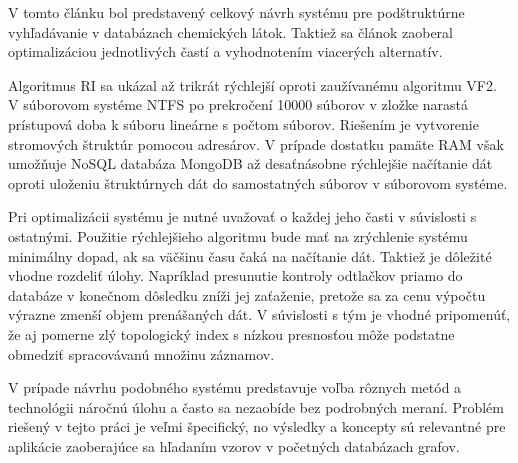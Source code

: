 \documentclass[slovak]{ExcelAtFIT} %
\begin{document}
V tomto článku bol predstavený celkový návrh systému pre podštruktúrne vyhľadávanie v databázach chemických látok. Taktiež sa článok zaoberal optimalizáciou jednotlivých častí a vyhodnotením viacerých alternatív.

Algoritmus RI sa ukázal až trikrát rýchlejší oproti zaužívanému algoritmu VF2. V súborovom systéme NTFS po prekročení 10000 súborov v zložke narastá prístupová doba k súboru lineárne s počtom súborov. Riešením je vytvorenie stromových štruktúr pomocou adresárov. V prípade dostatku pamäte RAM však umožňuje NoSQL databáza MongoDB až desaťnásobne rýchlejšie načítanie dát oproti uloženiu štruktúrnych dát do samostatných súborov v súborovom systéme. 

Pri optimalizácii systému je nutné uvažovať o každej jeho časti v súvislosti s ostatnými. Použitie rýchlejšieho algoritmu bude mať na zrýchlenie systému minimálny dopad, ak sa väčšinu času čaká na načítanie dát. Taktiež je dôležité vhodne rozdeliť úlohy. Napríklad presunutie kontroly odtlačkov priamo do databáze v konečnom dôsledku zníži jej zaťaženie, pretože sa za cenu výpočtu výrazne zmenší objem prenášaných dát. V súvislosti s tým je vhodné pripomenúť, že aj pomerne zlý topologický index s nízkou presnosťou môže podstatne obmedziť spracovávanú množinu záznamov.

V prípade návrhu podobného systému predstavuje voľba rôznych metód a technológii náročnú úlohu a často sa nezaobíde bez podrobných meraní. Problém riešený v tejto práci je veľmi špecifický, no výsledky a koncepty sú relevantné pre aplikácie zaoberajúce sa hľadaním vzorov v početných databázach grafov. 
\end{document}
